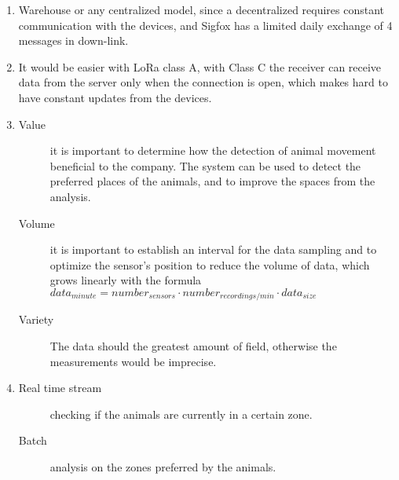 \documentclass[a4paper, 12pt]{article}
\begin{document}
\begin{exercise}
\begin{enumerate}
    \item Warehouse or any centralized model, since a decentralized requires
		constant communication with the devices, and Sigfox has a limited daily
		exchange of 4 messages in down-link.
	\item It would be easier with LoRa class A, with Class C the receiver can
	receive data from the server only when the connection is open, which makes
	hard to have constant updates from the devices.
	\item 
		\begin{description}
		    \item[Value] it is important to determine how the detection of
				animal movement beneficial to the company. The system can be
				used to detect the preferred places of the animals, and to
				improve the spaces from the analysis.
			\item[Volume] it is important to establish an interval for the data
				sampling and to optimize the sensor's position to reduce the
				volume of data, which grows linearly with the formula
				$data_{minute} = number_{sensors} \cdot
				number_{recordings/min} \cdot data_{size}$
			\item[Variety] The data should the greatest amount of field,
				otherwise the measurements would be imprecise. 
		\end{description}
	\item 
		\begin{description}
		    \item[Real time stream] checking if the animals are currently in a
				certain zone. 
			\item[Batch] analysis on the zones preferred by the
				animals.  
		\end{description}
\end{enumerate}
\end{exercise}
\end{document}
